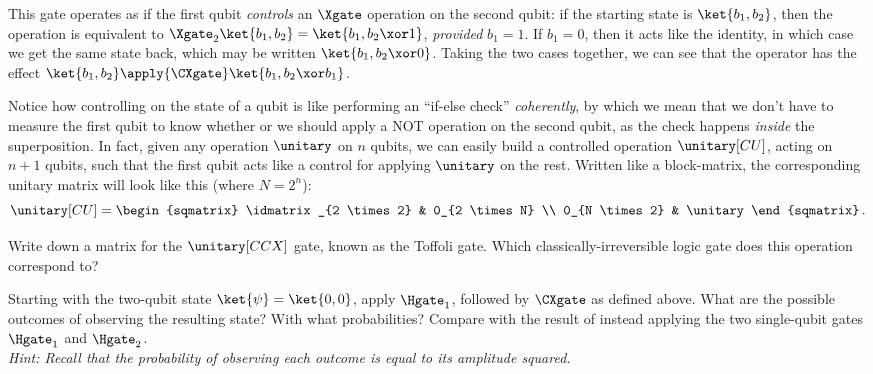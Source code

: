     \noindent
    This gate operates as if the first qubit \emph{controls} an $\Xgate$
      operation on the second qubit: if the starting state is $\ket{b_1, b_2}$, then the  
      operation is equivalent to $\Xgate_2 \ket{b_1, b_2} = \ket{b_1, b_2 \xor
      1}$, \emph{provided} $b_1 = 1$. If $b_1 = 0$, then it acts like the
      identity, in which case we get the same state back, which may be written
      $\ket{b_1, b_2 \xor 0}$. Taking the two cases together, we can see that
      the operator has the effect 
      $\ket{b_1, b_2} \apply{\CXgate}\ket{b_1, b_2 \xor b_1}$.


    Notice how controlling on the state of a qubit is like performing an
      ``if-else check'' \emph{coherently}, by which we mean that we don't have to measure
      the first qubit to know whether or we should apply a NOT operation on
      the second qubit, as the check happens \emph{inside} the superposition.
      In fact, given any operation $\unitary$ on $n$ qubits, we can easily build
      a controlled operation $\unitary[CU]$, acting on $n+1$
      qubits, such that the first qubit acts like a control for applying
      $\unitary$ on the rest. Written like a block-matrix, the corresponding
      unitary matrix will look like this (where $N = 2^n$):
    \[
      \unitary[CU] = 
      \begin{sqmatrix} 
        \idmatrix_{2 \times 2} & 0_{2 \times N} \\ 
        0_{N \times 2} & \unitary 
      \end{sqmatrix}\, .
    \]

    \begin{exercise}\label{ex:truthtable}
      Write down a matrix for the $\unitary[CCX]$ gate, known as the
      Toffoli gate. Which classically-irreversible logic gate does this
      operation correspond to?
    \end{exercise}

    \begin{exercise}
      Starting with the two-qubit state $\ket{\psi} = \ket{0, 0}$, apply
      $\Hgate_1$, followed by $\CXgate$ as defined above. 
      What are the possible outcomes of observing the resulting
      state? With what probabilities? Compare with the result of
      instead applying the two single-qubit gates $\Hgate_1$ and $\Hgate_2$.\\
      \emph{Hint: Recall that the probability of observing each outcome is equal
      to its amplitude squared.}
    \end{exercise}

